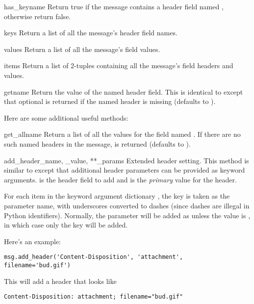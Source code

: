 \begin{methoddesc}[Message]{has_key}{name}
Return true if the message contains a header field named ,
otherwise return false.
\end{methoddesc}

\begin{methoddesc}[Message]{keys}{}
Return a list of all the message's header field names.
\end{methoddesc}

\begin{methoddesc}[Message]{values}{}
Return a list of all the message's field values.
\end{methoddesc}

\begin{methoddesc}[Message]{items}{}
Return a list of 2-tuples containing all the message's field headers
and values.
\end{methoddesc}

\begin{methoddesc}[Message]{get}{name}
Return the value of the named header field.  This is identical to
 except that optional  is returned
if the named header is missing (defaults to ).
\end{methoddesc}

Here are some additional useful methods:

\begin{methoddesc}[Message]{get_all}{name}
Return a list of all the values for the field named .
If there are no such named headers in the message,  is
returned (defaults to ).
\end{methoddesc}

\begin{methoddesc}[Message]{add_header}{_name, _value, **_params}
Extended header setting.  This method is similar to
 except that additional header parameters can be
provided as keyword arguments.   is the header field to add
and  is the \emph{primary} value for the header.

For each item in the keyword argument dictionary , the
key is taken as the parameter name, with underscores converted to
dashes (since dashes are illegal in Python identifiers).  Normally,
the parameter will be added as  unless the value is
, in which case only the key will be added.

Here's an example:

\begin{verbatim}
msg.add_header('Content-Disposition', 'attachment', filename='bud.gif')
\end{verbatim}

This will add a header that looks like

\begin{verbatim}
Content-Disposition: attachment; filename="bud.gif"
\end{verbatim}
\end{methoddesc}

